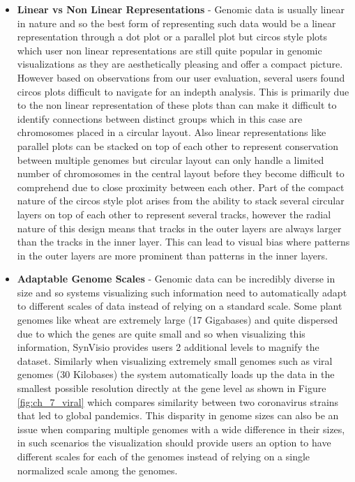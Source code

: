 \begin{itemize}
    \item \textbf{Linear vs Non Linear Representations} - Genomic data is usually linear in nature and so the best form of representing such data would be a linear representation through a dot plot or a parallel plot but circos style plots which user non linear representations are still quite popular in genomic visualizations as they are aesthetically pleasing and offer a compact picture. However based on observations from our user evaluation, several users found circos plots difficult to navigate for an indepth analysis. This is primarily due to the non linear representation of these plots than can make it difficult to identify connections between distinct groups which in this case are chromosomes placed in a circular layout. Also linear representations like parallel plots can be stacked on top of each other to represent conservation between multiple genomes but circular layout can only handle a limited number of chromosomes in the central layout before they become difficult to comprehend due to close proximity between each other. Part of the compact nature of the circos style plot arises from the ability to stack several circular layers on top of each other to represent several tracks, however the radial nature of this design means that tracks in the outer layers are always larger than the tracks in the inner layer. This can lead to visual bias where patterns in the outer layers are more prominent than patterns in the inner layers.
    
    \item \textbf{Adaptable Genome Scales} - Genomic data can be incredibly diverse in size and so systems visualizing such information need to automatically adapt to different scales of data instead of relying on a standard scale. Some plant genomes like wheat are extremely large (17 Gigabases) and quite dispersed due to which the genes are quite small and so when visualizing this information, SynVisio provides users 2 additional levels to magnify the dataset. Similarly when visualizing extremely small genomes such as viral genomes (30 Kilobases) the system automatically loads up the data in the smallest possible resolution directly at the gene level as shown in Figure \ref{fig:ch_7_viral} which compares similarity between two coronavirus strains that led to global pandemics. This disparity in genome sizes can also be an issue when comparing multiple genomes with a wide difference in their sizes, in such scenarios the visualization should provide users an option to have different scales for each of the genomes instead of relying on a single normalized scale among the genomes. 
\end{itemize}

